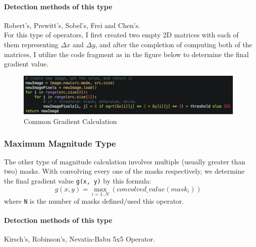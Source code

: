 \documentclass{article}
\newcommand{\code}[1]{\texttt{#1}}
\begin{document}
\paragraph{Detection methods of this type}
Robert's, Prewitt's, Sobel's, Frei and Chen's. \\

For this type of operators, I first created two empty 2D matrices with each of them representing $ \Delta x $ and $ \Delta y $, and after the completion of computing both of the matrices, I utilize the code fragment as in the figure below to determine the final gradient value.
\begin{figure}[H]
  \includegraphics[width=\linewidth]{img/normal_gradient.png}
  \caption{Common Gradient Calculation}
  \label{fig:normal_gradient}
\end{figure}

\subsubsection{Maximum Magnitude Type}
The other type of magnitude calculation involves multiple (usually greater than two) masks. With convolving every one of the masks respectively, we determine the final gradient value \code{g(x, y)} by this formula:
$$ g(x, y) = \max_{i=1..N}(convolved\_value(mask_{i})) $$
where \code{N} is the number of masks defined/used this operator. \\
\paragraph{Detection methods of this type}
Kirsch's, Robinson's, Nevatia-Babu 5x5 Operator. \\
\end{document}
